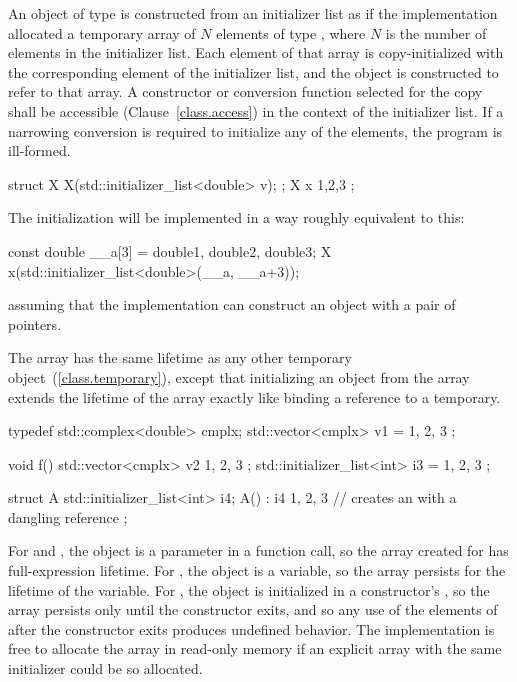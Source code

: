 \pnum
An object of type  is constructed from
an initializer list as if the implementation allocated a temporary array of $N$
elements of type , where $N$ is the number of elements in the
initializer list. Each element of that array is copy-initialized with the
corresponding element of the initializer list, and the
 object is constructed to refer to that array.
\enternote A constructor or conversion function selected for the copy shall be
accessible (Clause~\ref{class.access}) in the context of the initializer list.
\exitnote
If a narrowing conversion is required to initialize any of the elements, the program is ill-formed.\enterexample
\begin{codeblock}
struct X {
  X(std::initializer_list<double> v);
};
X x{ 1,2,3 };
\end{codeblock}

The initialization will be implemented in a way roughly equivalent to this:

\begin{codeblock}
const double __a[3] = {double{1}, double{2}, double{3}};
X x(std::initializer_list<double>(__a, __a+3));
\end{codeblock}

assuming that the implementation can construct an  object with a pair of pointers. \exitexample

\pnum
The array has the same lifetime as any other temporary
object~(\ref{class.temporary}), except that initializing an
 object from the array extends the lifetime of
the array exactly like binding a reference to a temporary.
\enterexample

\begin{codeblock}
typedef std::complex<double> cmplx;
std::vector<cmplx> v1 = { 1, 2, 3 };

void f() {
  std::vector<cmplx> v2{ 1, 2, 3 };
  std::initializer_list<int> i3 = { 1, 2, 3 };
}

struct A {
  std::initializer_list<int> i4;
  A() : i4{ 1, 2, 3 } {}  // creates an  with a dangling reference
};
\end{codeblock}

For  and , the  object
is a parameter in a function call, so the array created for
 has full-expression lifetime.
For , the  object is a variable,
so the array persists for the lifetime of the variable.
For , the  object is initialized in
a constructor's , so the array persists
only until the constructor exits, and so any use of the elements of
 after the constructor exits produces undefined behavior.
\exitexample
\enternote
The implementation is free to allocate the array in read-only memory if an explicit array with the same initializer could be so allocated. \exitnote

